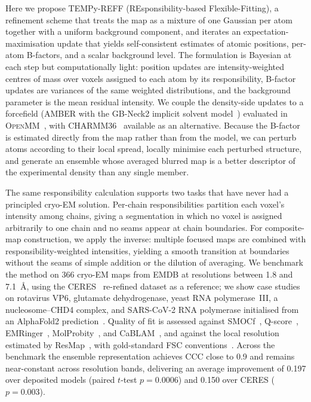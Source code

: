 Here we propose TEMPy-REFF (REsponsibility-based Flexible-Fitting), a refinement scheme that treats the map as a mixture of one Gaussian per atom together with a uniform background component, and iterates an expectation-maximisation update that yields self-consistent estimates of atomic positions, per-atom B-factors, and a scalar background level. The formulation is Bayesian at each step but computationally light: position updates are intensity-weighted centres of mass over voxels assigned to each atom by its responsibility, B-factor updates are variances of the same weighted distributions, and the background parameter is the mean residual intensity. We couple the density-side updates to a forcefield (AMBER with the GB-Neck2 implicit solvent model~\cite{nguyen2013}) evaluated in \textsc{OpenMM}~\cite{eastman2017}, with CHARMM36~\cite{huang2013} available as an alternative. Because the B-factor is estimated directly from the map rather than from the model, we can perturb atoms according to their local spread, locally minimise each perturbed structure, and generate an ensemble whose averaged blurred map is a better descriptor of the experimental density than any single member.

The same responsibility calculation supports two tasks that have never had a principled cryo-EM solution. Per-chain responsibilities partition each voxel's intensity among chains, giving a segmentation in which no voxel is assigned arbitrarily to one chain and no seams appear at chain boundaries. For composite-map construction, we apply the inverse: multiple focused maps are combined with responsibility-weighted intensities, yielding a smooth transition at boundaries without the seams of simple addition or the dilution of averaging. We benchmark the method on 366 cryo-EM maps from EMDB at resolutions between 1.8 and 7.1~\AA, using the CERES~\cite{liebschner2019} re-refined dataset as a reference; we show case studies on rotavirus VP6, glutamate dehydrogenase, yeast RNA polymerase~III, a nucleosome--CHD4 complex, and SARS-CoV-2 RNA polymerase initialised from an AlphaFold2 prediction~\cite{jumper2021,baek2021}. Quality of fit is assessed against SMOCf~\cite{farabella2015,joseph2017}, Q-score~\cite{pintilie2020}, EMRinger~\cite{barad2015}, MolProbity~\cite{williams2018,chen2010}, and CaBLAM~\cite{williams2018}, and against the local resolution estimated by ResMap~\cite{kucukelbir2014}, with gold-standard FSC conventions~\cite{rosenthal2003}. Across the benchmark the ensemble representation achieves CCC close to 0.9 and remains near-constant across resolution bands, delivering an average improvement of 0.197 over deposited models (paired $t$-test $p=0.0006$) and 0.150 over CERES ($p=0.003$).

